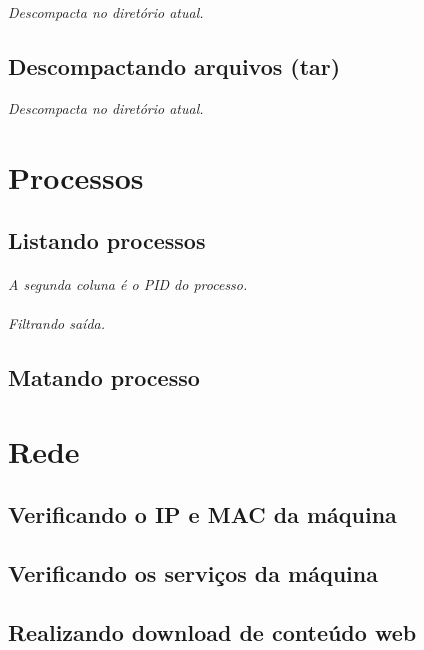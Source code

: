 \documentclass[a4paper,9pt]{extarticle}
\begin{document}
\begin{multicols}{2}
	 \emph{Descompacta no diretório atual.}
	
\subsection{Descompactando arquivos (tar)}
	
	 \emph{Descompacta no diretório atual.}
\section{Processos}
\subsection{Listando processos}
	
	\paragraph{} \emph{A segunda coluna é o PID do processo.} 
	
	\paragraph{} \emph{Filtrando saída.} 
	
\subsection{Matando processo}
%
\section{Rede}
\subsection{Verificando o IP e MAC da máquina}

	
\subsection{Verificando os serviços da máquina}
	

\subsection{Realizando download de conteúdo web}
	 

\end{multicols}
\end{document}

